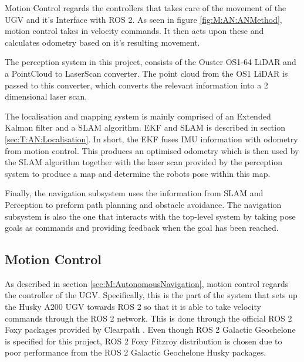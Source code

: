 Motion Control regards the controllers that takes care of the movement of the UGV and it's Interface with ROS 2. As seen in figure \ref{fig:M:AN:ANMethod}, motion control takes in velocity commands. It then acts upon these and calculates odometry based on it's resulting movement.

The perception system in this project, consists of the Ouster OS1-64 LiDAR and a PointCloud to LaserScan converter. The point cloud from the OS1 LiDAR is passed to this converter, which converts the relevant information into a 2 dimensional laser scan.

The localisation and mapping system is mainly comprised of an Extended Kalman filter and a SLAM algorithm. EKF and SLAM is described in section \ref{sec:T:AN:Localisation}. In short, the EKF fuses IMU information with odometry from motion control. This produces an optimised odometry which is then used by the SLAM algorithm together with the laser scan provided by the perception system to produce a map and determine the robots pose within this map.


Finally, the navigation subsystem uses the information from SLAM and Perception to preform path planning and obstacle avoidance. The navigation subsystem is also the one that interacts with the top-level system by taking pose goals as commands and providing feedback when the goal has been reached.

\subsection{Motion Control}\label{sec:M:AN:MotionControl}
As described in section \ref{sec:M:AutonomousNavigation}, motion control regards the controller of the UGV. Specifically, this is the part of the system that sets up the Husky A200 UGV towards ROS 2 so that it is able to take velocity commands through the ROS 2 network. This is done through the official ROS 2 Foxy packages provided by Clearpath \cite{husky_repo}. Even though ROS 2 Galactic Geochelone is specified for this project, ROS 2 Foxy Fitzroy distribution is chosen due to poor performance from the ROS 2 Galactic Geochelone Husky packages.


